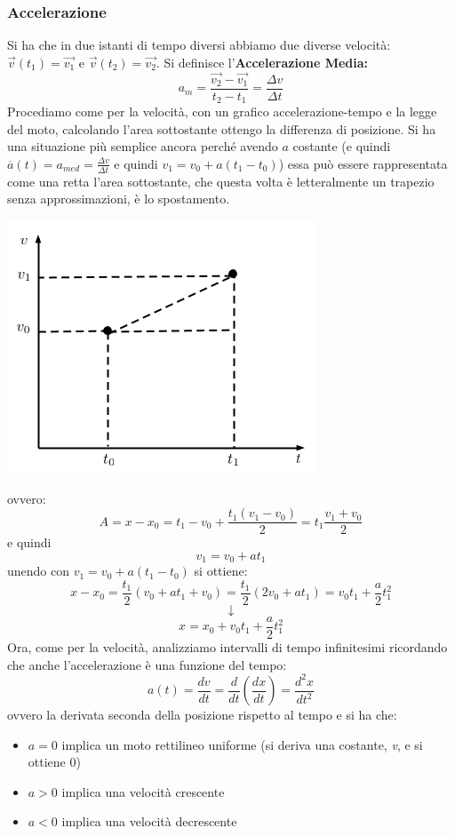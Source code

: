 \documentclass[a4paper,12pt, oneside]{book}
\begin{document}
\subsubsection{Accelerazione}
Si ha che in due istanti di tempo diversi abbiamo due diverse velocità: $\vec{v}(t_1)=\vec{v_1}$ e $\vec{v}(t_2)=\vec{v_2}$. Si definisce l'\textbf{Accelerazione Media:}
$$a_m=\frac{\vec{v_2}-\vec{v_1}}{t_2-t_1}=\frac{\Delta v}{\Delta t}$$
Procediamo come per la velocità, con un grafico accelerazione-tempo e la legge del moto, calcolando l'area sottostante ottengo la differenza di posizione. Si ha una situazione più semplice ancora perché avendo $a$ costante (e quindi $ \overline{a}(t)=a_{med}=\frac{\Delta v}{\Delta t}$ e quindi $v_1=v_0+a(t_1-t_0)$) essa può essere rappresentata come una retta l'area sottostante, che questa volta è letteralmente un trapezio senza approssimazioni, è lo spostamento.
\begin{center}
\includegraphics[scale=0.5]{img/gra2.png}
\end{center}
ovvero:
$$A=x-x_0=t_1-v_0+\frac{t_1(v_1-v_0)}{2}=t_1\frac{v_1+v_0}{2}$$ 
e quindi 
$$v_1=v_0+at_1$$
unendo con $v_1=v_0+a(t_1-t_0)$ si ottiene:
$$x-x_0=\frac{t_1}{2}(v_0+at_1+v_0)=\frac{t_1}{2}(2v_0+at_1)=v_0t_1+\frac{a}{2}t_1^2$$
$$\downarrow$$
$$x=x_0+v_0t_1+\frac{a}{2}t_1^2$$
Ora, come per la velocità, analizziamo intervalli di tempo infinitesimi ricordando che anche l'accelerazione è una funzione del tempo:
$$a(t)=\frac{dv}{dt}=\frac{d}{dt}\left(\frac{dx}{dt}\right)=\frac{d^2x}{dt^2}$$
ovvero la derivata seconda della posizione rispetto al tempo e si ha che:
\begin{itemize}
\item $a=0$ implica un moto rettilineo uniforme (si deriva una costante, \textit{v}, e si ottiene 0)
\item $a>0$ implica una velocità crescente
\item $a<0$ implica una velocità decrescente
\end{itemize}
\end{document}
